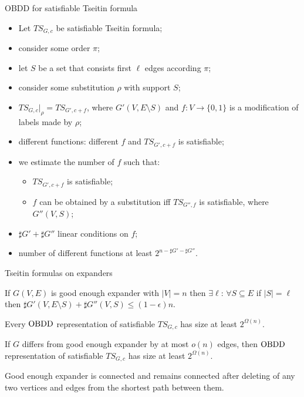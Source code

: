 \begin{frame}{OBDD for satisfiable Tseitin formula}

    \begin{itemize}
        \item Let $TS_{G, c}$ be satisfiable Tseitin formula;
        \item consider some order $\pi$;
        \item let $S$ be a set that consists first $\ell$ edges according $\pi$;
        \item consider some substitution $\rho$ with support $S$;
        \item $TS_{G, c}|_\rho = TS_{G', c + f}$, where $G'(V, E \setminus S)$ and $f: V \to \{0, 1\}$ is
            a modification of labels made by $\rho$;
        \item different functions: different $f$ and $TS_{G', c + f}$ is satisfiable;
        \item we estimate the number of $f$ such that:
            \begin{itemize}
                \item $TS_{G', c + f}$ is satisfiable;
                \item $f$ can be obtained by a substitution iff $TS_{G'', f}$ is satisfiable, where
                    $G''(V, S)$;
            \end{itemize}
        \item $\sharp G' + \sharp G''$ linear conditions on $f$;
        \item number of different functions at least $2^{n - \sharp G' - \sharp G''}$.
    \end{itemize}
    
\end{frame}


\begin{frame}{Tseitin formulas on expanders}
    \begin{theorem}
        If $G(V, E)$ is good enough expander with $|V| = n$ then $\exists \ell$: $\forall S \subseteq E$
        if $|S| = \ell$ then $\sharp G'(V, E \setminus S) + \sharp G''(V, S) \le (1 - \epsilon) n$.
    \end{theorem}

    \pause

    \begin{corollary}
        Every $\mathrm{OBDD}$ representation of satisfiable $TS_{G, c}$ has size at least $2^{\Omega(n)}$.
    \end{corollary}

    \pause

    \begin{corollary}
        If $G$ differs from good enough expander by at most $o(n)$ edges, then $\mathrm{OBDD}$ representation of
        satisfiable $TS_{G, c}$ has size at least $2^{\Omega(n)}$.
    \end{corollary}

    \begin{lemma}
        Good enough expander is connected and remains connected after deleting of any two vertices and
        edges from the shortest path between them.
    \end{lemma}
\end{frame}

